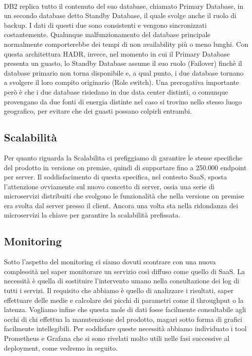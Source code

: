 \paragraph{}
DB2 replica tutto il contenuto del suo database, chiamato Primary Database, in un secondo database detto Standby Database, il quale svolge anche il ruolo di backup. I dati di questi due sono consistenti e vengono sincronizzati costantemente. Qualunque malfunzionamento del database principale normalmente comporterebbe dei tempi di non availability più o meno lunghi. Con questa architettura HADR, invece, nel momento in cui il Primary Database presenta un guasto, lo Standby Database assume il suo ruolo (Failover) finchè il database primario non torna disponibile e, a qual punto, i due database tornano a svolgere il loro compito originario (Role switch). Una prerogativa importante però è che i due database risiedano in due data center distinti, o comunque provengano da due fonti di energia distinte nel caso si trovino nello stesso luogo geografico, per evitare che dei guasti possano colpirli entrambi. 

\subsection{Scalabilità}
Per quanto riguarda la Scalabilita ci prefiggiamo di garantire le stesse specifiche del prodotto in versione on premise, quindi di supportare fino a 250.000 endpoint per server. Il soddisfacimento di questa specifica, nel contesto SaaS, sposta l'attenzione ovviamente sul nuovo concetto di server, ossia una serie di microservizi distribuiti che svolgono le funzionalità che nella versione on premise era svolta dal server presso il client. Ancora una volta sta nella ridondanza dei microservizi la chiave per garantire la scalabilità prefissata.

\subsection{Monitoring}
Sotto l'aspetto del monitoring ci siamo dovuti scontrare con una nuova complessità nel saper monitorare un servizio così diffuso come quello di SaaS. La necessità è quella di sostituire l'intervento umano nella consultazione dei log di tutti i servizi. Il requisito che abbiamo è quello di analizzare i risultati, saper effettuare delle medie e calcolare dei picchi di parametri come il throughput o la latenza. Vogliamo infine che questa mole di dati fosse facilmente consultabile agli occhi di chi effettua la manutenzione del prodotto, magari sotto forma di grafici facilmente intellegibili. Per soddisfare queste necessità abbiamo individuato i tool Prometheus e Grafana che si sono rivelati molto utili nelle fasi successive al deployment, come vedremo in seguito.  


